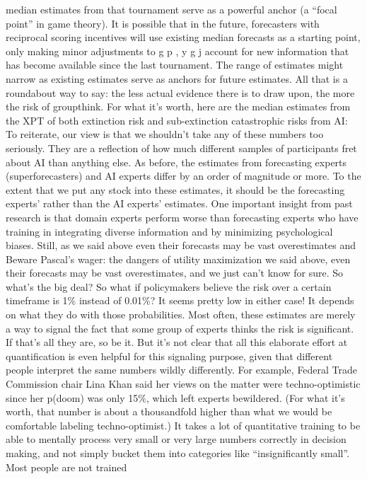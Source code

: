median estimates from that tournament serve as a powerful anchor
(a “focal point” in game theory). It is possible that in the future,
forecasters with reciprocal scoring incentives will use existing median
forecasts as a starting point, only making minor adjustments to
g p
,
y
g
j
account for new information that has become available since the last
tournament. The range of estimates might narrow as existing
estimates serve as anchors for future estimates. All that is a
roundabout way to say: the less actual evidence there is to draw
upon, the more the risk of groupthink.
For what it’s worth, here are the median estimates from the XPT of
both extinction risk and sub-extinction catastrophic risks from AI:
To reiterate, our view is that we shouldn’t take any of these numbers
too seriously. They are a reﬂection of how much different samples of
participants fret about AI than anything else.
As before, the estimates from forecasting experts (superforecasters)
and AI experts differ by an order of magnitude or more. To the extent
that we put any stock into these estimates, it should be the
forecasting experts’ rather than the AI experts’ estimates. One
important insight from past research is that domain experts perform
worse than forecasting experts who have training in integrating
diverse information and by minimizing psychological biases. Still, as
we said above even their forecasts may be vast overestimates and
Beware Pascal’s wager: the dangers of utility
maximization
we said above, even their forecasts may be vast overestimates, and
we just can’t know for sure.
So what’s the big deal? So what if policymakers believe the risk over
a certain timeframe is 1\% instead of 0.01\%? It seems pretty low in
either case!
It depends on what they do with those probabilities. Most often, these
estimates are merely a way to signal the fact that some group of
experts thinks the risk is signiﬁcant. If that’s all they are, so be it. But
it’s not clear that all this elaborate effort at quantiﬁcation is even
helpful for this signaling purpose, given that different people interpret
the same numbers wildly differently.
For example, Federal Trade Commission chair Lina Khan said her
views on the matter were techno-optimistic since her p(doom) was
only 15\%, which left experts bewildered. (For what it’s worth, that
number is about a thousandfold higher than what we would be
comfortable labeling techno-optimist.) It takes a lot of quantitative
training to be able to mentally process very small or very large
numbers correctly in decision making, and not simply bucket them
into categories like “insigniﬁcantly small”. Most people are not trained
